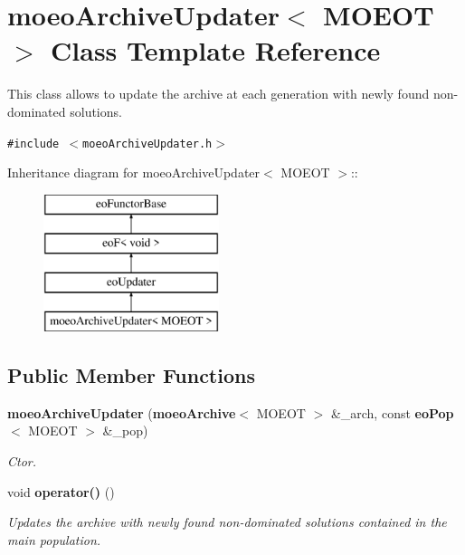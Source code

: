 \section{moeo\-Archive\-Updater$<$ MOEOT $>$ Class Template Reference}
\label{classmoeoArchiveUpdater}
This class allows to update the archive at each generation with newly found non-dominated solutions.  


{\tt \#include $<$moeo\-Archive\-Updater.h$>$}

Inheritance diagram for moeo\-Archive\-Updater$<$ MOEOT $>$::\begin{figure}[H]
\begin{center}
\leavevmode
\includegraphics[height=4cm]{classmoeoArchiveUpdater}
\end{center}
\end{figure}
\subsection*{Public Member Functions}
\begin{CompactItemize}
\item 
{\bf moeo\-Archive\-Updater} ({\bf moeo\-Archive}$<$ MOEOT $>$ \&\_\-arch, const {\bf eo\-Pop}$<$ MOEOT $>$ \&\_\-pop)
\begin{CompactList}\small\item\em Ctor. \item\end{CompactList}\item 
void {\bf operator()} ()\label{classmoeoArchiveUpdater_3d72137dce51d0d4f0cc7207be42878a}

\begin{CompactList}\small\item\em Updates the archive with newly found non-dominated solutions contained in the main population. \item\end{CompactList}\end{CompactItemize}
